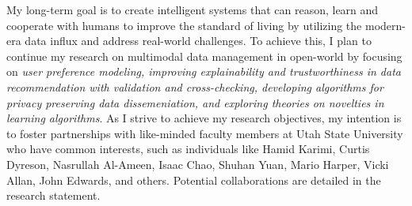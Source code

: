 \documentclass[9pt]{article}
\begin{document}
My long-term goal is to create intelligent systems that can reason, learn and cooperate with humans to improve the standard of living by utilizing the 
modern-era data influx
and address real-world challenges.
To achieve this, I plan to continue my research on multimodal data management in open-world by focusing on \textit{user preference modeling, improving explainability and trustworthiness in data recommendation with validation and cross-checking, developing algorithms for privacy preserving data dissemeniation, and exploring theories on novelties in learning algorithms}. 
%
%
As I strive to achieve my research objectives, my intention is to foster partnerships with like-minded faculty members at Utah State University who have common interests, such as individuals like Hamid Karimi, Curtis Dyreson, Nasrullah Al-Ameen, Isaac Chao, Shuhan Yuan, Mario Harper, Vicki Allan, John Edwards, and others. Potential collaborations are detailed in the research statement. 
\end{document}
